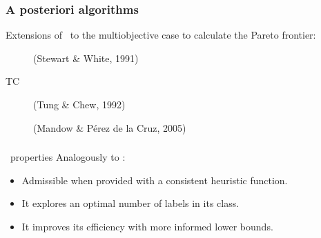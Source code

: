\begin{frame} 
\frametitle{A posteriori algorithms}
Extensions of \astar \ to the multiobjective case to calculate the Pareto frontier:
	\vspace{5mm}
	\begin{description}
		\item[\moa] \quad (Stewart \& White, 1991) \only<2->{$\rightarrow$ \textcolor{red}{pathological behaviour}}
		\vspace{2mm}
		\item[TC] \quad (Tung \& Chew, 1992) \only<2->{$\rightarrow$ \textcolor{red}{less efficient than \namoa}}
		\vspace{2mm}		
		\item[\namoa] \quad (Mandow \& P\'{e}rez de la Cruz,  2005)
	\end{description}
	\vspace{5mm}
\note{}
\end{frame}
\begin{frame}
\frametitle{\namoa}
	\begin{block}{\namoa \ properties}
		\vspace{2mm}
		Analogously to \astar: 
		\vspace{1mm}
		\begin{itemize}
			\item \textcolor{ao}{Admissible} when provided with a consistent heuristic function.
			\vspace{1mm}
			\item It explores an \textcolor{ao}{optimal number of labels} in its class.
			\vspace{1mm}
			\item It \textcolor{ao}{improves} its efficiency \textcolor{ao}{with more informed lower bounds}.
		\end{itemize}
	\end{block}
\end{frame}

